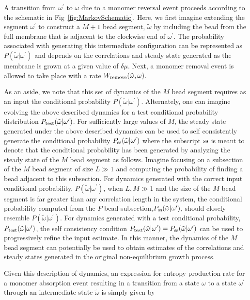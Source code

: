 \documentclass[amsmath,preprintnumbers,10pt,nofootinbib,prl,twocolumn]{revtex4-1}
\begin{document}
A transition from $\omega^\prime$ to $\omega$ due to a monomer reversal event proceeds according to the schematic in Fig~\ref{fig:MarkovSchematic}. Here, we first imagine extending the segment $\omega^\prime$ to construct a $M+1$ bead segment, $\tilde{\omega}$ by including the bead from the full membrane that is adjacent to the clockwise end of $\omega^\prime$. The probability associated with generating this intermediate configuration can be represented as $P(\tilde{\omega}|\omega^\prime)$ and depends on the correlations and steady state generated as the membrane is grown at a given value of $\delta \mu$. Next, a monomer removal event is allowed to take place with a rate $W_{\rm remove}(\tilde{\omega},\omega)$. 

As an aside, we note that this set of dynamics of the $M$ bead segment requires as an input the conditional probability $P(\tilde{\omega}|\omega^\prime)$. Alternately, one can imagine evolving the above described dynamics for a test conditional probability distribution $P_{\rm test}(\tilde{\omega}|\omega^\prime)$. For sufficiently large values of $M$, the steady state generated under the above described dynamics can be used to self consistently generate the conditional probability $P_{\rm ss}(\tilde{\omega}|\omega^\prime)$ where the subscript ${\rm ss}$ is meant to denote that the conditional probability has been generated by analyzing the steady state of the $M$ bead segment as follows. Imagine focusing on a subsection of the $M$ bead segment of size $L\gg 1$ and computing the probability of finding a bead adjacent to this subsection. For dynamics generated with the correct input conditional probability, $P(\tilde{\omega}|\omega^\prime)$, when $L,M\gg 1$ and the size of the $M$ bead segment is far greater than any correlation length in the system, the conditional probability computed from the $P$ bead subsection,$P_{\rm ss}(\tilde{\omega}|\omega^\prime)$, should closely resemble $P(\tilde{\omega}|\omega^\prime)$. For dynamics generated with a test conditional probability, $P_{\rm test}(\tilde{\omega}|\omega^\prime)$, the self consistency condition $P_{\rm test}(\tilde{\omega}|\omega^\prime)=P_{\rm ss}(\tilde{\omega}|\omega^\prime)$ can be used to progressively refine the input estimate. In this manner, the dynamics of the $M$ bead segment can potentially be used to obtain estimates of the correlations and steady states generated in the original non-equilibrium growth process. 


Given this description of dynamics, an expression for entropy production rate for a monomer absorption event resulting in a transition from a state $\omega$ to a state $\omega^\prime$ through an intermediate state $\tilde\omega$ is simply given by 
\end{document}
